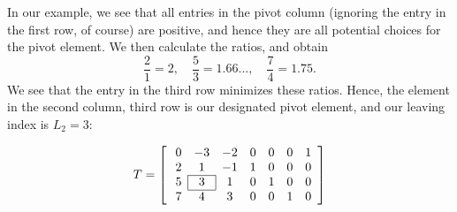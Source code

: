 In our example, we see that all entries in the pivot column (ignoring the entry in the first row, of course) are positive,
and hence they are all potential choices for the pivot element. We then calculate the ratios, and obtain
\[
\frac{2}{1} = 2,\quad \frac{5}{3} = 1.66...,\quad \frac{7}{4} = 1.75.
\]
We see that the entry in the third row minimizes these ratios. Hence, the element in the second column, third row is our designated
pivot element, and our leaving index is $L_2 = 3$:

\[ T = \left[ \:
\begin{array}{*{7}{c}}

0 & -3 & -2 & 0 & 0 & 0 & 1\\
2 & 1 & -1 & 1 & 0 & 0 & 0\\\cline{2-2}
5 & \multicolumn{1}{|c}{3} & \multicolumn{1}{|c}{1} & 0 & 1 & 0 & 0\\\cline{2-2}
7 & 4 & 3 & 0 & 0 & 1 & 0\\
\end{array}
\right] \]

